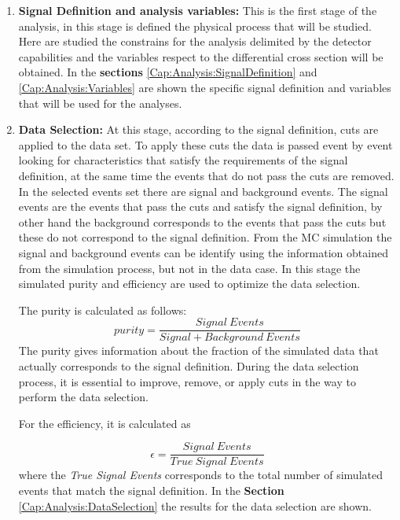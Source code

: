 \begin{enumerate}
    \item \textbf{Signal Definition and analysis variables:} This is the first stage of the analysis, in this stage is defined the physical process that will be studied. Here are studied the constrains for the analysis delimited by the detector capabilities and the variables respect to the differential cross section will be obtained. In the \textbf{sections} \ref{Cap:Analysis:SignalDefinition} and \ref{Cap:Analysis:Variables} are shown the specific signal definition and variables that will be used for the analyses. 

    \item \textbf{Data Selection:} At this stage, according to the signal definition, cuts are applied to the data set. To apply these cuts the data is passed event by event looking for characteristics that satisfy the requirements of the signal definition, at the same time the events that do not pass the cuts are removed. In the selected events set there are signal and background events. The signal events are the events that pass the cuts and satisfy the signal definition, by other hand the background corresponds to the events that pass the cuts but these do not correspond to the signal definition. From the MC simulation the signal and background events can be identify using the information obtained from the simulation process, but not in the data case. In this stage the simulated purity and efficiency are used to optimize the data selection. 

    The purity is calculated as follows:
    \begin{equation}
        purity=\frac{Signal\ Events}{Signal+Background\ Events}
        \label{eq:Analysis:Purity}
    \end{equation}
    The purity gives information about the fraction of the simulated data that actually corresponds to the signal definition. During the data selection process, it is essential to improve, remove, or apply cuts in the way to perform the data selection.

    For the efficiency, it is calculated as 
    
    \begin{equation}
        \epsilon=\frac{Signal\ Events}{True\ Signal\ Events}
        \label{eq:Analysis:efficiency}
    \end{equation}
    where the \textit{True Signal Events} corresponds to the total number of simulated events that match the signal definition. 
    In the \textbf{Section} \ref{Cap:Analysis:DataSelection} the results for the data selection are shown. 


\end{enumerate}
